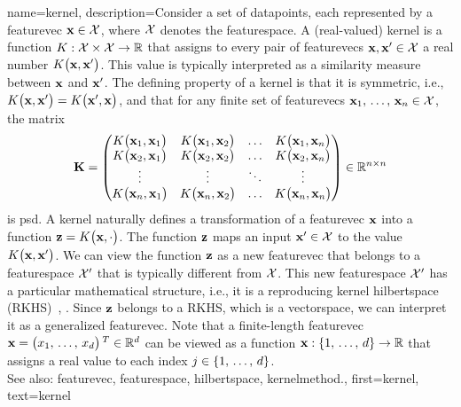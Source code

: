{name={kernel}, 
	description={Consider a set of \glspl{datapoint}, each represented by a \gls{featurevec} 
	 	${\bf x} \in \mathcal{X}$, where $\mathcal{X}$ denotes the \gls{featurespace}. 
	 	A (real-valued) kernel is a \gls{function} 
	 	$K: \mathcal{X} \times \mathcal{X} \rightarrow \mathbb{R}$ that assigns to every pair of 
     		\glspl{featurevec} ${\bf x}, {\bf x}' \in \mathcal{X}$ a real number $K\big({\bf x},{\bf x}'\big)$. 
     		This value is typically interpreted as a similarity measure between ${\bf x}$ and ${\bf x}'$. 
	 	The defining property of a kernel is that it is symmetric, i.e.,
	 	$K\big({\bf x},{\bf x}'\big) = K\big({\bf x}',{\bf x}\big)$, and that 
	 	for any finite set of \glspl{featurevec} ${\bf x}_1, \,\ldots, \,{\bf x}_n \in \mathcal{X}$, the \gls{matrix} 
	  	\begin{equation}
	 		\nonumber
	 		\mathbf{K} = \begin{pmatrix}
	 			K\big({\bf x}_1,{\bf x}_1\big) & K\big({\bf x}_1,{\bf x}_2\big) & \ldots & K\big({\bf x}_1,{\bf x}_n\big) \\
	 			K\big({\bf x}_2,{\bf x}_1\big) & K\big({\bf x}_2,{\bf x}_2\big) & \ldots & K\big({\bf x}_2,{\bf x}_n\big) \\
	 			\vdots											
	 			& \vdots & \ddots & \vdots \\
	 			K\big({\bf x}_n,{\bf x}_1\big) & K\big({\bf x}_n,{\bf x}_2\big) & \ldots & K\big({\bf x}_n,{\bf x}_n\big) 
	 		\end{pmatrix} \in \mathbb{R}^{n \times n}
	 	\end{equation}
	 	is \gls{psd}. 
     		A kernel naturally defines a transformation of a \gls{featurevec} ${\bf x}$ into a 
	 	\gls{function} ${\bf z} = K\big({\bf x},\cdot\big)$. The \gls{function} ${\bf z}$ maps an  
	 	input ${\bf x}' \in \mathcal{X}$ to the value $K\big({\bf x},{\bf x}'\big)$. 
	 	We can view the \gls{function} ${\bf z}$ as a new \gls{featurevec} that belongs to a 
	 	\gls{featurespace} $\mathcal{X}'$ that is typically different from $\mathcal{X}$. 
	 	This new \gls{featurespace} $\mathcal{X}'$ has a particular mathematical structure, i.e., it is a 
	 	reproducing kernel \gls{hilbertspace} (RKHS)~\cite{LearningKernelsBook}, \cite{LampertNowKernel}.
     		Since ${\bf z}$ belongs to a RKHS, which is a \gls{vectorspace}, we can interpret it as a generalized 
	 	\gls{featurevec}. Note that a finite-length \gls{featurevec} ${\bf x}=\big(x_{1}, \,\ldots, \,x_{d} \big)\,^{T} \in \mathbb{R}^{d}$ 
	 	can be viewed as a \gls{function} ${\bf x}: \{1, \,\ldots, \,d\} \rightarrow \mathbb{R}$ 
	 	that assigns a real value to each index $j \in \{1, \,\ldots, \,d\}$.
          		\\
		See also: \gls{featurevec}, \gls{featurespace}, \gls{hilbertspace}, \gls{kernelmethod}.},
	first={kernel},
	text={kernel} 
}
	
